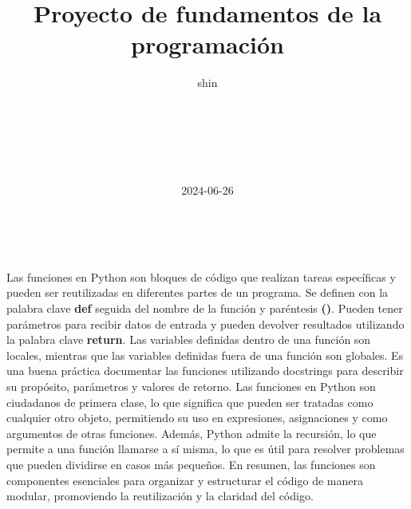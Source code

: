 \documentclass[a4paper]{article}
\author{shin}
\date{2024-06-26}
\newcommand\textstyleListLabeli[1]{\foreignlanguage{spanish}{\textrm{\textbf{\textup{#1}}}}}
\begin{document}
\clearpage
\pagestyle{Standard}
\title{Proyecto de fundamentos de la programación}\\
\author{\\
\and
{}\\
\and
{}\\
}

\maketitle
\begin{enumerate}[series=listWWNumi,label=\textstyleListLabeli{\arabic*.},ref=\arabic*]
\item {
\section{Funciones en Python}
\end{enumerate}

\bigskip

{
Las funciones en Python son bloques de código que realizan tareas específicas y pueden ser reutilizadas en diferentes
partes de un programa. Se definen con la palabra clave \textbf{def }seguida del nombre de la función y paréntesis
\textbf{()}. Pueden tener parámetros para recibir datos de entrada y pueden devolver resultados utilizando la palabra
clave \textbf{return}. Las variables definidas dentro de una función son locales, mientras que las variables definidas
fuera de una función son globales. Es una buena práctica documentar las funciones utilizando docstrings para describir
su propósito, parámetros y valores de retorno. Las funciones en Python son ciudadanos de primera clase, lo que
significa que pueden ser tratadas como cualquier otro objeto, permitiendo su uso en expresiones, asignaciones y como
argumentos de otras funciones. Además, Python admite la recursión, lo que permite a una función llamarse a sí misma, lo
que es útil para resolver problemas que pueden dividirse en casos más pequeños. En resumen, las funciones son
componentes esenciales para organizar y estructurar el código de manera modular, promoviendo la reutilización y la
claridad del código.}
\end{document}
